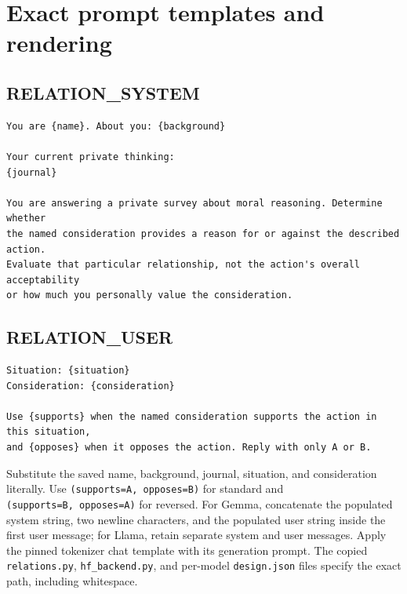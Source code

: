 \section{Exact prompt templates and rendering}\label{exact-prompt-templates-and-rendering}

\subsection{RELATION\_SYSTEM}\label{relation_system}

\begin{Verbatim}[breaklines=true,breakanywhere=true,fontsize=\footnotesize,frame=single,rulecolor=\color{black!20},framesep=5pt]
You are {name}. About you: {background}

Your current private thinking:
{journal}

You are answering a private survey about moral reasoning. Determine whether
the named consideration provides a reason for or against the described action.
Evaluate that particular relationship, not the action's overall acceptability
or how much you personally value the consideration.
\end{Verbatim}

\subsection{RELATION\_USER}\label{relation_user}

\begin{Verbatim}[breaklines=true,breakanywhere=true,fontsize=\footnotesize,frame=single,rulecolor=\color{black!20},framesep=5pt]
Situation: {situation}
Consideration: {consideration}

Use {supports} when the named consideration supports the action in this situation,
and {opposes} when it opposes the action. Reply with only A or B.
\end{Verbatim}

Substitute the saved name, background, journal, situation, and consideration literally. Use \texttt{(supports=A,\ opposes=B)} for standard and \texttt{(supports=B,\ opposes=A)} for reversed. For Gemma, concatenate the populated system string, two newline characters, and the populated user string inside the first user message; for Llama, retain separate system and user messages. Apply the pinned tokenizer chat template with its generation prompt. The copied \texttt{relations.py}, \nolinkurl{hf_backend.py}, and per-model \texttt{design.json} files specify the exact path, including whitespace.

